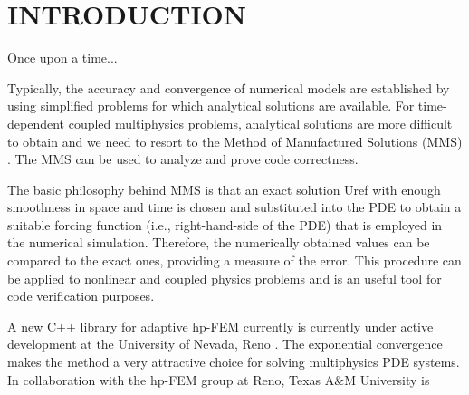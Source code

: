 \section*{INTRODUCTION}
Once upon a time...

Typically, the accuracy and convergence of numerical models are established by using simplified problems for which analytical solutions are available. For time-dependent coupled multiphysics problems, analytical solutions are more difficult to obtain and we need to resort to the Method of Manufactured Solutions (MMS) \cite{roache2002}. The MMS can be used to analyze and prove code correctness.

The basic philosophy behind MMS is that an exact solution Uref with enough smoothness in space and time is chosen and substituted into the PDE to obtain a suitable forcing function (i.e., right-hand-side of the PDE) that is employed in the numerical simulation. Therefore, the numerically obtained values can be compared to the exact ones, providing a measure of the error. This procedure can be applied to nonlinear and coupled physics problems and is an useful tool for code verification purposes.

A new C++ library for adaptive hp-FEM currently is currently under active development at the University of Nevada, Reno \cite{solin2010}.   The exponential convergence makes the method a very attractive choice for solving multiphysics PDE systems.  In collaboration with the hp-FEM group at Reno, Texas A\&M University is

